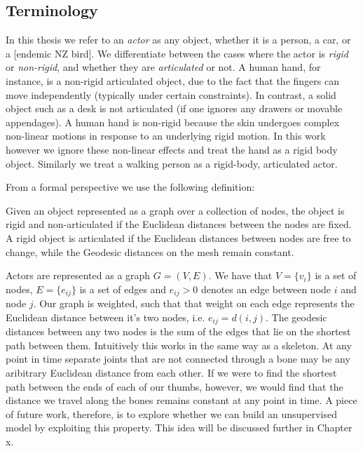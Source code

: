 \subsection{Terminology}

In this thesis we refer to an \textit{actor} as any object, whether it is a person, a car, or a [endemic NZ bird]. We differentiate between the cases where the actor is \textit{rigid} or \textit{non-rigid}, and whether they are \textit{articulated} or not. A human hand, for instance, is a non-rigid articulated object, due to the fact that the fingers can move independently (typically under certain constraints). In contrast, a solid object such as a desk is not articulated (if one ignores any drawers or movable appendages). A human hand is non-rigid because the skin undergoes complex non-linear motions in response to an underlying rigid motion. In this work however we ignore these non-linear effects and treat the hand as a rigid body object. Similarly we treat a walking person as a rigid-body, articulated actor. 

From a formal perspective we use the following definition:

\theoremstyle{definition}
\begin{definition}
\label{articulatedActor}
Given an object represented as a graph over a collection of nodes, the object is rigid and non-articulated if the Euclidean distances between the nodes are fixed. A rigid object is articulated if the Euclidean distances between nodes are free to change, while the Geodesic distances on the mesh remain constant. 
\end{definition}

Actors are represented as a graph $G = (V, E)$. We have that $V = \{v_i\}$ is a set of nodes, $E = \{e_{ij}\}$ is a set of edges and $e_{ij} > 0$ denotes an edge between node $i$ and node $j$. Our graph is weighted, such that that weight on each edge represents the Euclidean distance between it's two nodes, i.e. $e_{ij} = d(i,j)$. The geodesic distances between any two nodes is the sum of the edges that lie on the shortest path between them. Intuitively this works in the same way as a skeleton. At any point in time separate joints that are not connected through a bone may be any aribitrary Euclidean distance from each other. If we were to find the shortest path between the ends of each of our thumbs, however, we would find that the distance we travel along the bones remains constant at any point in time. A piece of future work, therefore, is to explore whether we can build an unsupervised model by exploiting this property. This idea will be discussed further in Chapter x.

